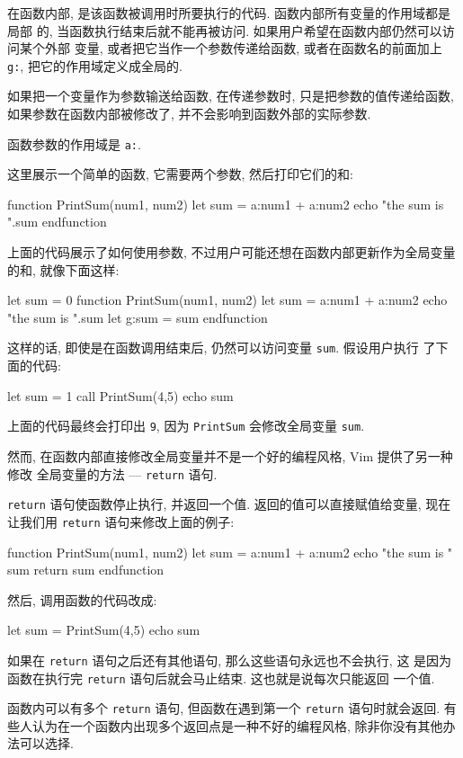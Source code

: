 在函数内部, 是该函数被调用时所要执行的代码. 函数内部所有变量的作用域都是局部
的, 当函数执行结束后就不能再被访问. 如果用户希望在函数内部仍然可以访问某个外部
变量, 或者把它当作一个参数传递给函数, 或者在函数名的前面加上 \texttt{g:},
把它的作用域定义成全局的.
\begin{warning}
    如果把一个变量作为参数输送给函数, 在传递参数时, 只是把参数的值传递给函数,
    如果参数在函数内部被修改了, 并不会影响到函数外部的实际参数.
\end{warning}

函数参数的作用域是 \texttt{a:}.

这里展示一个简单的函数, 它需要两个参数, 然后打印它们的和:
\begin{vimcode}
function PrintSum(num1, num2)
    let sum = a:num1 + a:num2
    echo "the sum is ".sum
endfunction
\end{vimcode}
上面的代码展示了如何使用参数, 不过用户可能还想在函数内部更新作为全局变量的和,
就像下面这样:
\begin{vimcode}
let sum = 0
function PrintSum(num1, num2)
    let sum = a:num1 + a:num2
    echo "the sum is ".sum
    let g:sum = sum
endfunction
\end{vimcode}
这样的话, 即使是在函数调用结束后, 仍然可以访问变量 \texttt{sum}. 假设用户执行
了下面的代码:
\begin{vimcode}
let sum = 1
call PrintSum(4,5)
echo sum
\end{vimcode}
上面的代码最终会打印出 \texttt{9}, 因为 \texttt{PrintSum} 会修改全局变量
\texttt{sum}.

然而, 在函数内部直接修改全局变量并不是一个好的编程风格, Vim 提供了另一种修改
全局变量的方法 --- \texttt{return} 语句.

\texttt{return} 语句使函数停止执行, 并返回一个值. 返回的值可以直接赋值给变量,
现在让我们用 \texttt{return} 语句来修改上面的例子:
\begin{vimcode}
function PrintSum(num1, num2)
    let sum = a:num1 + a:num2
    echo "the sum is " sum
    return sum
endfunction
\end{vimcode}
然后, 调用函数的代码改成:
\begin{vimcode}
let sum = PrintSum(4,5)
echo sum
\end{vimcode}

如果在 \texttt{return} 语句之后还有其他语句, 那么这些语句永远也不会执行, 这
是因为函数在执行完 \texttt{return} 语句后就会马止结束. 这也就是说每次只能返回
一个值.

\begin{warning}
    函数内可以有多个 \texttt{return} 语句, 但函数在遇到第一个 \texttt{return}
    语句时就会返回. 有些人认为在一个函数内出现多个返回点是一种不好的编程风格,
    除非你没有其他办法可以选择.
\end{warning}

